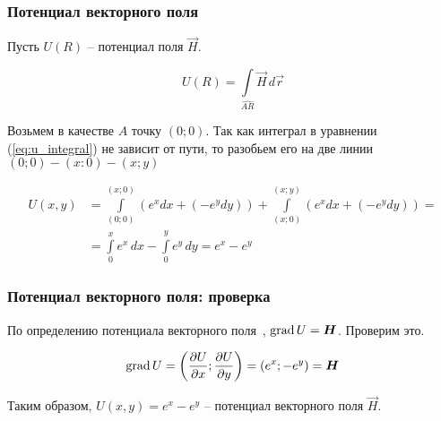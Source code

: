 \begin{frame}\frametitle{Потенциал векторного поля}
	Пусть \(U(R)\) -- потенциал поля \(\vec H\).

	\begin{equation*}
		U(R) =
		\int\limits_{\widehat{AR}} \vec H \, d \vec r
		\label{eq:u_integral}
	\end{equation*}

	Возьмем в качестве $A$ точку $(0; 0)$.
	Так как интеграл в уравнении (\ref{eq:u_integral}) не зависит от пути,
	то разобьем его на две линии $(0; 0) - (x: 0) - (x; y)$

	\begin{align*}
		U(x, y) & = \int\limits_{(0; 0)}^{(x; 0)} \left(e^x dx + (-e^y dy) \right) +
		\int\limits_{(x; 0)}^{(x; y)} \left(e^x dx + (-e^y dy) \right) =      \\
		     & =
		\int\limits_{0}^{x} e^x \, dx - \int\limits_{0}^{y} e^y \, dy =
		e^{x} - e^{y}
	\end{align*}

\end{frame}

\begin{frame}\frametitle{Потенциал векторного поля: проверка}
	По определению потенциала векторного поля~\cite[ст.~269]{zorich}, $\grad U = \vec H$. Проверим это.

	\begin{equation*}
		\grad U =
		\left( \frac{\partial U}{\partial x}; \frac{\partial U}{\partial y} \right) =
		\left( e^x; -e^y \right)
		= \vec H
	\end{equation*}

	Таким образом, \(U(x,y) = e^{x} - e^{y}\) -- потенциал векторного поля \(\vec H\).
\end{frame}

